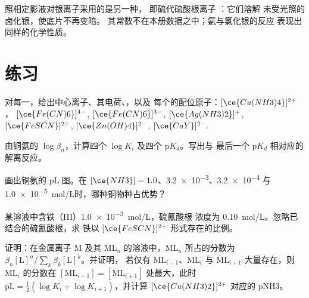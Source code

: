照相定影液对银离子采用的是另一种，
即硫代硫酸根离子 ：它们溶解
未受光照的卤化银，使底片不再变暗。
其常数不在本册数据之中；氨与氯化银的反应
表现出同样的化学性质。

\section{练习}

\begin{exercise}[$\star$]\label{exo:b1:complexation:1}
对每一，给出中心离子、其电荷、，以及
每个的配位原子：$[\ce{Cu(NH3)4}]^{2+}$，
$[\ce{Fe(CN)6}]^{4-}$, $[\ce{Fe(CN)6}]^{3-}$, $[\ce{Ag(NH3)2}]^{+}$,
$[\ce{FeSCN}]^{2+}$, $[\ce{Zn(OH)4}]^{2-}$, $[\ce{CaY}]^{2-}$.
\end{exercise}

\begin{exercise}[$\star$]\label{exo:b1:complexation:2}
由铜氨的 $\log\beta_n$，计算四个 $\log K_i$
及四个 $\mathrm{p}K_d$。写出与
最后一个 $\mathrm{p}K_d$ 相对应的解离反应。
\end{exercise}

\begin{exercise}[$\star$]\label{exo:b1:complexation:3}
画出铜氨的 pL 图。在
$[\ce{NH3}] = 1.0$、\num{3.2e-3}、\num{3.2e-4} 与
\qty{1.0e-5}{mol/L}时，哪种铜物种占优势？
\end{exercise}

\begin{exercise}[$\star$]\label{exo:b1:complexation:4}
某溶液中含铁（III）\qty{1.0e-3}{mol/L}，硫氰酸根
浓度为 \qty{0.10}{mol/L}。忽略已结合的硫氰酸根，求
铁以 $[\ce{FeSCN}]^{2+}$ 形式存在的比例。
\end{exercise}

\begin{exercise}[$\star\star$]\label{exo:b1:complexation:5}
证明：在金属离子 M 及其
$\mathrm{ML}_n$ 的溶液中，$\mathrm{ML}_n$ 所占的分数为
$\beta_n[\mathrm{L}]^n / \sum_{k} \beta_k[\mathrm{L}]^k$。并证明，
若仅有 $\mathrm{ML}_{i-1}$、$\mathrm{ML}_i$ 与 $\mathrm{ML}_{i+1}$ 大量存在，则
$\mathrm{ML}_i$ 的分数在
$[\mathrm{ML}_{i-1}] = [\mathrm{ML}_{i+1}]$ 处最大，此时
$\mathrm{pL} = \frac12(\log K_i + \log K_{i+1})$，并计算
$[\ce{Cu(NH3)2}]^{2+}$ 对应的 pNH3。
\end{exercise}

